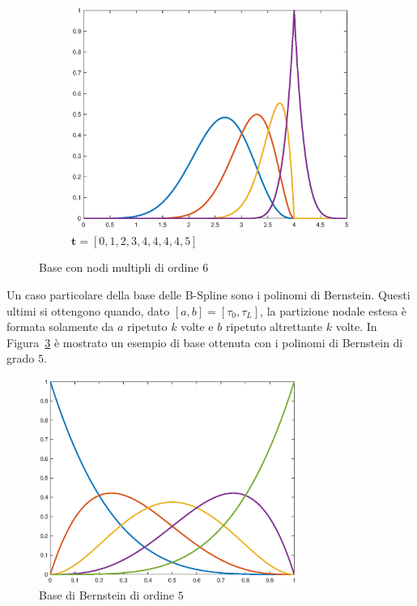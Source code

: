 \documentclass[a4paper, 10pt]{article}
\begin{document}
\begin{figure}[h]
\begin{subfigure}[b]{0.3\textwidth}
  \end{subfigure}
  \begin{subfigure}[b]{0.3\textwidth}
    \includegraphics[width=\textwidth]{figure/6_45.eps}
    \caption{$\mathbf{t} = [0, 1, 2, 3, 4, 4, 4, 4, 5]$}
    \label{fig:645}
  \end{subfigure}
  \caption{Base con nodi multipli di ordine 6}\label{fig:animals}
\end{figure}

Un caso particolare della base delle B-Spline sono i polinomi di Bernstein. Questi ultimi si ottengono quando, 
dato $[a, b] = [\tau_0, \tau_L]$, la partizione nodale estesa è formata solamente da $a$ ripetuto $k$ volte
e $b$ ripetuto altrettante $k$ volte. In Figura~\ref{fig:bernstein} è mostrato un esempio di base ottenuta con 
i polinomi di Bernstein di grado $5$.

\begin{figure}[h]
  \centering
  \includegraphics[width=0.75\textwidth]{figure/bernstein5_from_cox_de_boor.eps}
  \caption{Base di Bernstein di ordine $5$}
  \label{fig:bernstein}
\end{figure} 
\end{document}
